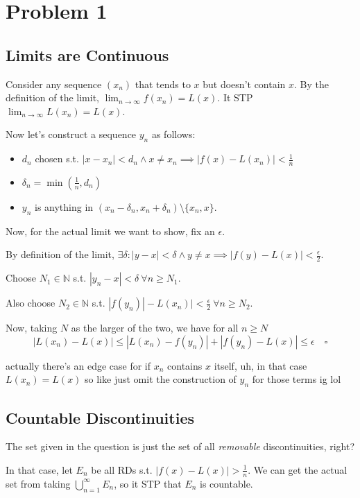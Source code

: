 \documentclass[12pt]{article}
\newcommand{\N}{\mathbb{N}}
\begin{document}
\section{Problem 1}

\subsection{Limits are Continuous}

Consider any sequence $(x_n)$ that tends to $x$ but doesn't contain $x$.
By the definition of the limit, $\lim_{n \to \infty} f(x_n) = L(x)$.
It STP $\lim_{n \to \infty} L(x_n) = L(x)$.

Now let's construct a sequence $y_n$ as follows:
\begin{itemize}[nolistsep]
  \item $d_n$ chosen s.t. $|x-x_n| < d_n \land x \ne x_n \implies |f(x)-L(x_n)| < \frac{1}{n}$
  \item $\delta_n=\min\left(\frac{1}{n}, d_n\right)$
  \item $y_n$ is anything in $(x_n-\delta_n, x_n+\delta_n) \setminus \{x_n, x\}$.
\end{itemize}

Now, for the actual limit we want to show, fix an $\epsilon$.

By definition of the limit, $\exists \delta: |y-x| < \delta \land y \ne x \implies |f(y)-L(x)| < \frac{\epsilon}{2}$.

Choose $N_1 \in \N$ s.t. $|y_n-x| < \delta\ \forall n \ge N_1$.

Also choose $N_2 \in \N$ s.t. $|f(y_n)|-L(x_n)| < \frac{\epsilon}{2}\ \forall n \ge N_2$.

Now, taking $N$ as the larger of the two, we have for all $n \ge N$
\[|L(x_n)-L(x)| \le |L(x_n)-f(y_n)|+|f(y_n)-L(x)| \le \epsilon\quad\square\]

actually there's an edge case for if $x_n$ contains $x$ itself, uh,
in that case $L(x_n)=L(x)$ so like just omit the construction of $y_n$ for those terms ig lol

\subsection{Countable Discontinuities}

The set given in the question is just the set of all \textit{removable} discontinuities, right?

In that case, let $E_n$ be all RDs s.t. $|f(x)-L(x)| > \frac{1}{n}$.
We can get the actual set from taking $\bigcup_{n=1}^\infty E_n$,
so it STP that $E_n$ is countable.
\end{document}

